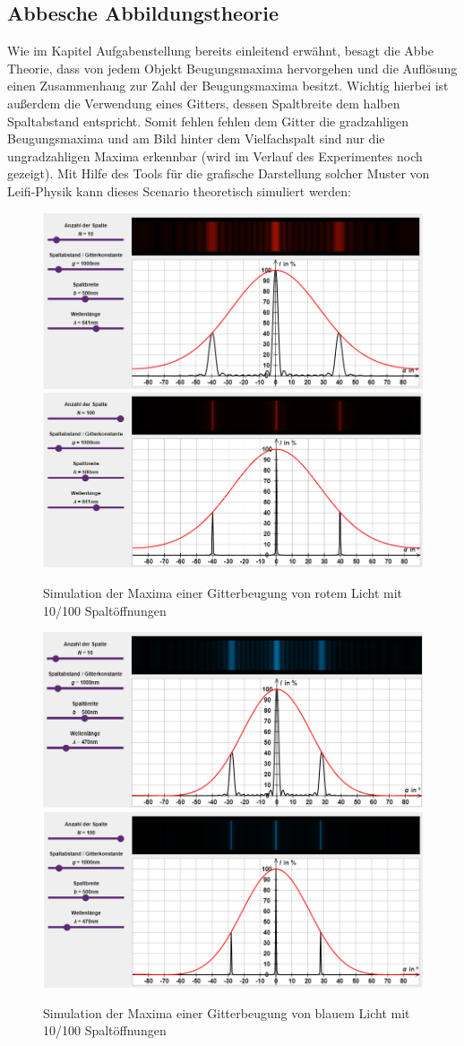 \documentclass[12pt,a4paper,twoside]{article}
\begin{document}
\subsection{Abbesche Abbildungstheorie}

Wie im Kapitel Aufgabenstellung bereits einleitend erwähnt, besagt die Abbe Theorie, dass von jedem Objekt Beugungsmaxima hervorgehen und die Auflösung einen Zusammenhang zur Zahl der Beugungsmaxima besitzt.
Wichtig hierbei ist außerdem die Verwendung eines Gitters, dessen Spaltbreite dem halben Spaltabstand entspricht. Somit fehlen fehlen dem Gitter die gradzahligen Beugungsmaxima und am Bild hinter dem Vielfachspalt sind nur die ungradzahligen Maxima erkennbar (wird im Verlauf des Experimentes noch gezeigt).
Mit Hilfe des Tools für die grafische Darstellung solcher Muster von Leifi-Physik \cite{leifi} kann dieses Scenario theoretisch simuliert werden:

\begin{figure}[H]
    \centering
    \includegraphics[width=0.4\linewidth]{nudes/VG-Simulation10Nrot.png}
    \includegraphics[width=0.4\linewidth]{nudes/VG-Simulation100Nrot.png}
    \caption{Simulation der Maxima einer Gitterbeugung von rotem Licht mit 10/100 Spaltöffnungen}
    \label{fig:SimulationRot}
\end{figure}

\begin{figure}[H]
    \centering
    \includegraphics[width=0.4\linewidth]{nudes/VG-Simulation10Nblau.png}
    \includegraphics[width=0.4\linewidth]{nudes/VG-Simulation100Nblau.png}
    \caption{Simulation der Maxima einer Gitterbeugung von blauem Licht mit 10/100 Spaltöffnungen}
    \label{fig:SimulationBlau}
\end{figure}
\end{document}
